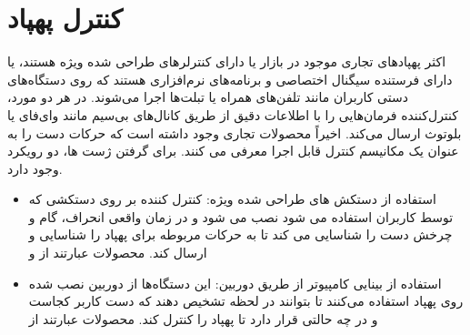 \section{کنترل پهپاد}
اکثر پهپادهای تجاری موجود در بازار یا دارای کنترلرهای طراحی شده ویژه هستند، یا دارای فرستنده سیگنال اختصاصی و برنامه‌های نرم‌افزاری هستند که روی دستگاه‌های دستی کاربران 
مانند تلفن‌های همراه یا تبلت‌ها اجرا می‌شوند. در هر دو مورد، کنترل‌کننده فرمان‌هایی را با اطلاعات دقیق از طریق کانال‌های بی‌سیم مانند 
وای‌فای یا بلوتوث ارسال می‌کند. اخیراً محصولات تجاری وجود داشته است که حرکات دست را به عنوان یک مکانیسم کنترل قابل اجرا معرفی می کنند. برای گرفتن ژست ها، دو رویکرد وجود دارد.
\begin{itemize}
    \item	استفاده از دستکش های طراحی شده ویژه: کنترل کننده بر روی دستکشی که توسط کاربران استفاده می شود نصب می شود و در زمان واقعی انحراف، گام و چرخش دست را شناسایی می کند 
    تا به حرکات مربوطه برای پهپاد را شناسایی و ارسال کند. محصولات عبارتند از  و 
    \item 	استفاده از بینایی کامپیوتر از طریق دوربین: این دستگاه‌ها از دوربین نصب شده روی پهپاد استفاده می‌کنند تا بتوانند در لحظه تشخیص دهند که دست کاربر کجاست
    و در چه حالتی قرار دارد تا پهپاد را کنترل کند. محصولات عبارتند از  
\end{itemize}





